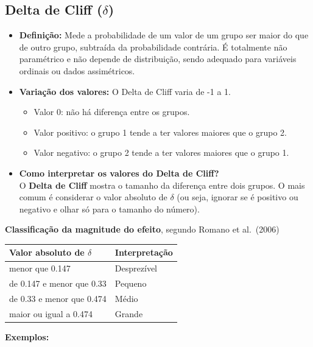 \documentclass[
]{book}
\newcounter{none} %
\providecommand{\tightlist}{%
  \setlength{\itemsep}{0pt}\setlength{\parskip}{0pt}}
\begin{document}
\subsection{\texorpdfstring{Delta de Cliff (\(\delta\))}{Delta de Cliff (\textbackslash delta)}}\label{delta-de-cliff-delta}

\begin{itemize}
\tightlist
\item
  \textbf{Definição:} Mede a probabilidade de um valor de um grupo ser maior do que de outro grupo, subtraída da probabilidade contrária. É totalmente não paramétrico e não depende de distribuição, sendo adequado para variáveis ordinais ou dados assimétricos.
\item
  \textbf{Variação dos valores:} O Delta de Cliff varia de -1 a 1.

  \begin{itemize}
  \tightlist
  \item
    Valor 0: não há diferença entre os grupos.
  \item
    Valor positivo: o grupo 1 tende a ter valores maiores que o grupo 2.
  \item
    Valor negativo: o grupo 2 tende a ter valores maiores que o grupo 1.
  \end{itemize}
\item
  \textbf{Como interpretar os valores do Delta de Cliff?}\\
  O \textbf{Delta de Cliff} mostra o tamanho da diferença entre dois grupos. O mais comum é considerar o valor absoluto de \(\delta\) (ou seja, ignorar se é positivo ou negativo e olhar só para o tamanho do número).
\end{itemize}

\textbf{Classificação da magnitude do efeito}, segundo Romano et al.~(2006)

{\def\LTcaptype{none} %
\begin{longtable}[]{@{}ll@{}}
\toprule\noalign{}
Valor absoluto de \(\delta\) & Interpretação \\
\midrule\noalign{}
\endhead
\bottomrule\noalign{}
\endlastfoot
menor que 0.147 & Desprezível \\
de 0.147 e menor que 0.33 & Pequeno \\
de 0.33 e menor que 0.474 & Médio \\
maior ou igual a 0.474 & Grande \\
\end{longtable}
}

\textbf{Exemplos:}
\end{document}
